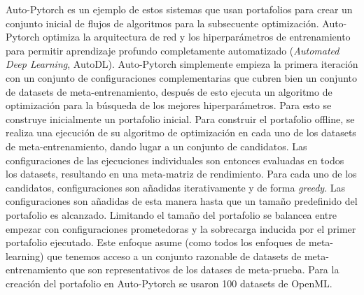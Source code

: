 \documentclass[a4paper,10pt,twocolumn]{article}
\begin{document}
Auto-Pytorch \cite{zimmer2021auto} es un ejemplo de estos sistemas que usan portafolios para crear un conjunto inicial de flujos de algoritmos para la subsecuente optimización. Auto-Pytorch optimiza la arquitectura de red y los hiperparámetros de entrenamiento para permitir aprendizaje profundo completamente automatizado (\textit{Automated Deep Learning}, AutoDL). 
 Auto-Pytorch simplemente empieza la primera iteración con un conjunto de configuraciones complementarias que cubren bien un conjunto de datasets de meta-entrenamiento, después de esto ejecuta un algoritmo de optimización para la búsqueda de los mejores hiperparámetros. Para esto se construye inicialmente un portafolio inicial. Para construir el portafolio offline, se realiza una ejecución de su algoritmo de optimización en cada uno de los datasets de meta-entrenamiento, dando lugar a un conjunto de candidatos. Las configuraciones de las ejecuciones individuales son entonces evaluadas en todos los datasets, resultando en una meta-matriz de rendimiento. Para cada uno de los candidatos, configuraciones son añadidas iterativamente y de forma \textit{greedy}.
 Las configuraciones son añadidas de esta manera hasta que un tamaño predefinido del portafolio es alcanzado. Limitando el tamaño del portafolio se balancea entre empezar con configuraciones prometedoras y la sobrecarga inducida por el primer portafolio ejecutado. Este enfoque asume (como todos los enfoques de meta-learning) que tenemos acceso a un conjunto razonable de datasets de meta-entrenamiento que son representativos de los datases de meta-prueba. Para la creación del portafolio en Auto-Pytorch se usaron 100 datasets de OpenML.
\end{document}
